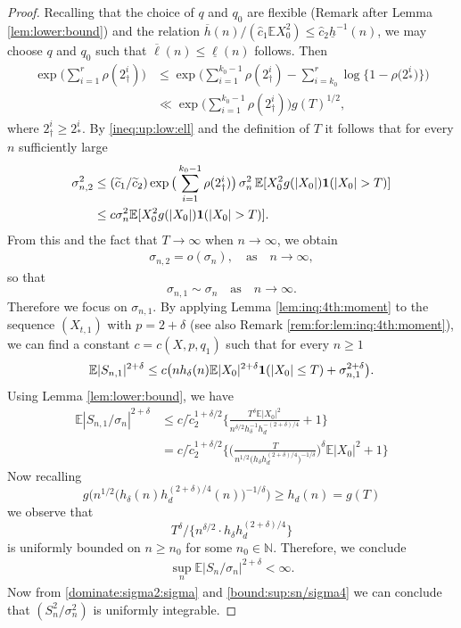 \documentclass[11pt,a4,leqno]{amsart}
\newcommand{\N}{\mathbb{N}}
\newcommand{\ov}{\overline}
\newcommand{\ud}{\underline}
\newcommand{\wt}{\widetilde}
\newcommand{\wh}{\widehat}
\newcommand{\E }{{\mathbb E}}
\newcommand{\1}{{\mathbf 1}}
\begin{document}
\begin{proof}
Recalling that the choice of $q$ and $q_0$ are flexible (Remark after Lemma \ref{lem:lower:bound})
 and the relation $\ov h (n)/(\wh c_1 \E X_0^2) \le \wh c_2 \ud h^{-1}(n)$, we may choose $q$ and $q_0$ 
such that $\ov \ell(n) \le \ud \ell(n)$ follows. 
Then 
\begin{align}
\label{ineq:up:low:ell}
 \exp\Big( \sum_{i=1}^r \rho (2_\dag^i)\Big) &\le \exp\Big(
\sum_{i=1}^{k_0-1} \rho (2_\dag^i)- \sum_{i=k_0}^r \log \big\{ 1-\rho\big(2_\ast^i\big) \big\}
\Big)\\
& \ll \exp\Big(
\sum_{i=1}^{k_0-1} \rho (2_\dag^i) \Big) g(T)^{1/2}, \nonumber
\end{align}
where $2_\dag^i \ge 2_\ast^i $.
By \eqref{ineq:up:low:ell} and the definition of $T$ it follows that for every $n$ sufficiently large 
\begin{align*}
 \sigma_{n,2}^2 
&\le (\wt c_1/\wt c_2) \exp\big( \sum_{i=1}^{k_0-1} \rho(2_\dag^i) \big)\, \sigma_n^2\, \E[X_0^2 g(|X_0|){\bf 1}(|X_0| >T)] \\
&\le c \sigma_n^2 \E[X_0^2 g(|X_0|){\bf 1}(|X_0| >T)]. 
\end{align*}
From this and the fact that $T\to\infty$ when $n\to\infty$, we obtain 
\begin{align}
\label{dominate:sigma2:sigma}
 \sigma_{n,2}=o(\sigma_n),\quad \text{as}\quad n\to\infty,
\end{align}
so that 
\[
 \sigma_{n,1} \sim \sigma_n\quad \text{as}\quad n\to\infty.
\]
Therefore we focus on $\sigma_{n,1}$.
By applying Lemma \ref{lem:inq:4th:moment} to the sequence $(X_{t,1})$ 
with $p=2+\delta$ (see also Remark \ref{rem:for:lem:inq:4th:moment}), we can find a constant 
$c=c(X,p,q_1)$ such that for every $n\ge 1$
\[
 \E |S_{n,1}|^{2+\delta} \le c \big(
n h_\delta (n)\E |X_0|^{2+\delta}{\bf 1}(|X_0| \le T) +\sigma_{n,1}^{2+\delta}
\big).
\]
Using Lemma \ref{lem:lower:bound}, we have 
\begin{align*}
 \E |S_{n,1}/\sigma_n|^{2+\delta} &\le c /\wt c_2^{1+\delta/2} \bigg\{
\frac{T^\delta \E|X_0|^2}{n^{\delta/2} h_\delta^{-1} h_d^{-(2+\delta)/4}}+1
\bigg\} \\
& =  c/\wt c_2^{1+\delta/2} 
\Bigg\{
\bigg(
\frac{T}{n^{1/2} \big( h_\delta 
h_d^{(2+\delta)/4} \big)^{-1/\delta}} \bigg)^{\delta}
\E |X_0|^2
+1
\Bigg\}
\end{align*}
Now recalling
\[
 g\Big(
n^{1/2} \big(h_\delta(n)h_d^{(2+\delta)/4}(n) \big)^{-1/\delta}\Big) \ge h_d(n) =g(T)
\]
we observe that 
\[
 T^\delta / \big\{ n^{\delta/2} \cdot h_\delta h_d^{(2+\delta)/4} \big\}
\]
is uniformly bounded on $n\ge n_0$ for some $n_0\in \N$.
Therefore, we conclude 
\begin{align}
\label{bound:sup:sn/sigma4}
 \sup_n \E |S_n/\sigma_n|^{2+\delta} <\infty.
\end{align}
Now from \eqref{dominate:sigma2:sigma} and \eqref{bound:sup:sn/sigma4} we can conclude that 
$(S_n^2/\sigma^2_n)$ is uniformly integrable. 
\end{proof}
\end{document}
